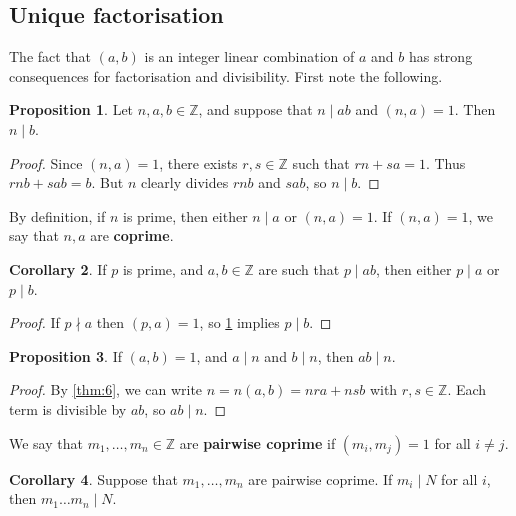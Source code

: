 \documentclass{article}
\newcommand{\Z}{\mathbb{Z}}
\newcommand{\rb}[1]{\left( #1 \right)}
\theoremstyle{definition}\newtheorem{definition}{Definition}
\theoremstyle{definition}\newtheorem*{remark}{Remark}
\theoremstyle{definition}\newtheorem*{example}{Example}
\theoremstyle{definition}\newtheorem*{note}{Note}
\newtheorem{proposition}[definition]{Proposition}
\newtheorem{corollary}[definition]{Corollary}
\begin{document}
\subsection{Unique factorisation}

The fact that $ \rb{a, b} $ is an integer linear combination of $ a $ and $ b $ has strong consequences for factorisation and divisibility. First note the following.

\begin{proposition}
\label{prop:7}
Let $ n, a, b \in \Z $, and suppose that $ n \mid ab $ and $ \rb{n, a} = 1 $. Then $ n \mid b $.
\end{proposition}

\begin{proof}
Since $ \rb{n, a} = 1 $, there exists $ r, s \in \Z $ such that $ rn + sa = 1 $. Thus $ rnb + sab = b $. But $ n $ clearly divides $ rnb $ and $ sab $, so $ n \mid b $.
\end{proof}

By definition, if $ n $ is prime, then either $ n \mid a $ or $ \rb{n, a} = 1 $. If $ \rb{n, a} = 1 $, we say that $ n, a $ are \textbf{coprime}.


\begin{corollary}
\label{cor:8}
If $ p $ is prime, and $ a, b \in \Z $ are such that $ p \mid ab $, then either $ p \mid a $ or $ p \mid b $.
\end{corollary}

\begin{proof}
If $ p \nmid a $ then $ \rb{p, a} = 1 $, so \ref{prop:7} implies $ p \mid b $.
\end{proof}

\begin{proposition}
\label{prop:9}
If $ \rb{a, b} = 1 $, and $ a \mid n $ and $ b \mid n $, then $ ab \mid n $.
\end{proposition}

\begin{proof}
By \ref{thm:6}, we can write $ n = n\rb{a, b} = nra + nsb $ with $ r, s \in \Z $. Each term is divisible by $ ab $, so $ ab \mid n $.
\end{proof}

We say that $ m_1, \dots, m_n \in \Z $ are \textbf{pairwise coprime} if $ \rb{m_i, m_j} = 1 $ for all $ i \ne j $.

\begin{corollary}
\label{cor:10}
Suppose that $ m_1, \dots, m_n $ are pairwise coprime. If $ m_i \mid N $ for all $ i $, then $ m_1 \dots m_n \mid N $.
\end{corollary}
\end{document}
